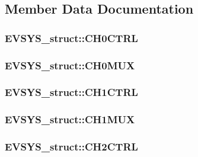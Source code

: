\subsection{Member Data Documentation}
\hypertarget{struct_e_v_s_y_s__struct_a039473dcd1af123093bfcbfc988500fa}{
\subsubsection[{CH0CTRL}]{ {\bf EVSYS\_\-struct::CH0CTRL}}}
\label{struct_e_v_s_y_s__struct_a039473dcd1af123093bfcbfc988500fa}
\hypertarget{struct_e_v_s_y_s__struct_a6e32eebe659f4ccfdb2691cac4d035db}{
\subsubsection[{CH0MUX}]{ {\bf EVSYS\_\-struct::CH0MUX}}}
\label{struct_e_v_s_y_s__struct_a6e32eebe659f4ccfdb2691cac4d035db}
\hypertarget{struct_e_v_s_y_s__struct_acfcd6e3239d534f4985e6af989bc0d5d}{
\subsubsection[{CH1CTRL}]{ {\bf EVSYS\_\-struct::CH1CTRL}}}
\label{struct_e_v_s_y_s__struct_acfcd6e3239d534f4985e6af989bc0d5d}
\hypertarget{struct_e_v_s_y_s__struct_a839d5a508a07c077506b9ec5571542b1}{
\subsubsection[{CH1MUX}]{ {\bf EVSYS\_\-struct::CH1MUX}}}
\label{struct_e_v_s_y_s__struct_a839d5a508a07c077506b9ec5571542b1}
\hypertarget{struct_e_v_s_y_s__struct_aad6770f876114bdb60e39d09122d8f41}{
\subsubsection[{CH2CTRL}]{ {\bf EVSYS\_\-struct::CH2CTRL}}}
